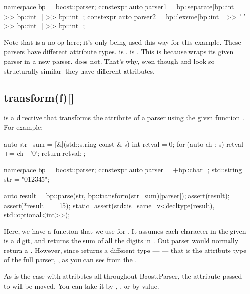 \documentclass{MyBook}
\begin{document}
\begin{code}
namespace bp = boost::parser;
constexpr auto parser1 = bp::separate[bp::int_ >> bp::int_] >> bp::int_;
constexpr auto parser2 = bp::lexeme[bp::int_ >> ' ' >> bp::int_] >> bp::int_;
\end{code}

Note that  is a no-op here; it's only being used this way for this example. These parsers have different attribute types. \emph{} is . \emph{} is . This is because  wraps its given parser in a new parser.  does not. That's why, even though  and  look so structurally similar, they have different attributes.

\subsection{{}{transform(f){[}{]}}}

 is a directive that transforms the attribute of a parser using the given function . For example:

\begin{code}
auto str_sum = [&](std::string const & s) {
    int retval = 0;
    for (auto ch : s) {
        retval += ch - '0';
    }
    return retval;
};

namespace bp = boost::parser;
constexpr auto parser = +bp::char_;
std::string str = "012345";

auto result = bp::parse(str, bp::transform(str_sum)[parser]);
assert(result);
assert(*result == 15);
static_assert(std::is_same_v<decltype(result), std::optional<int>>);
\end{code}

Here, we have a function  that we use for . It assumes each character in the given   is a digit, and returns the sum of all the digits in . Out parser  would normally return a . However, since  returns a different type ---  --- that is the attribute type of the full parser, , as you can see from the .

As is the case with attributes all throughout Boost.Parser, the attribute passed to  will be moved. You can take it by , \ci{\&\&}, or by value.
\end{document}
